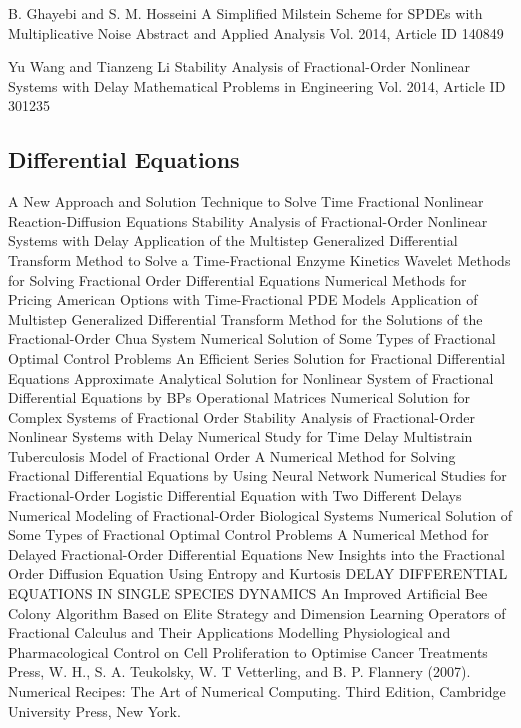 \begin{thebibliography}{00}
B. Ghayebi and S. M. Hosseini
\newblock A Simplified Milstein Scheme for SPDEs with Multiplicative Noise
\newblock Abstract and Applied Analysis Vol. 2014, Article ID 140849

Yu Wang and Tianzeng Li
\newblock Stability Analysis of Fractional-Order Nonlinear Systems with Delay
\newblock Mathematical Problems in Engineering Vol. 2014, Article ID 301235


\subsection{Differential Equations}

A New Approach and Solution Technique to Solve Time Fractional Nonlinear Reaction-Diffusion Equations
Stability Analysis of Fractional-Order Nonlinear Systems with Delay
Application of the Multistep Generalized Differential Transform Method to Solve a Time-Fractional Enzyme Kinetics
Wavelet Methods for Solving Fractional Order Differential Equations
Numerical Methods for Pricing American Options with Time-Fractional PDE Models
Application of Multistep Generalized Differential Transform Method for the Solutions of the Fractional-Order Chua System
Numerical Solution of Some Types of Fractional Optimal Control Problems
An Efficient Series Solution for Fractional Differential Equations
Approximate Analytical Solution for Nonlinear System of Fractional Differential Equations by BPs Operational Matrices
Numerical Solution for Complex Systems of Fractional Order
Stability Analysis of Fractional-Order Nonlinear Systems with Delay
Numerical Study for Time Delay Multistrain Tuberculosis Model of Fractional Order
A Numerical Method for Solving Fractional Differential Equations by Using Neural Network
Numerical Studies for Fractional-Order Logistic Differential Equation with Two Different Delays
Numerical Modeling of Fractional-Order Biological Systems
Numerical Solution of Some Types of Fractional Optimal Control Problems
A Numerical Method for Delayed Fractional-Order Differential Equations
 New Insights into the Fractional Order Diffusion Equation Using Entropy and Kurtosis
 DELAY DIFFERENTIAL EQUATIONS IN SINGLE SPECIES DYNAMICS
 An Improved Artificial Bee Colony Algorithm Based on Elite Strategy and Dimension Learning
Operators of Fractional Calculus and Their Applications
 Modelling Physiological and Pharmacological Control on Cell Proliferation to Optimise Cancer Treatments
Press, W. H., S. A. Teukolsky, W. T Vetterling, and B. P. Flannery (2007). 
\newblock Numerical Recipes: The Art of Numerical Computing. 
\newblock Third Edition, Cambridge University Press, New York.


\end{thebibliography}
